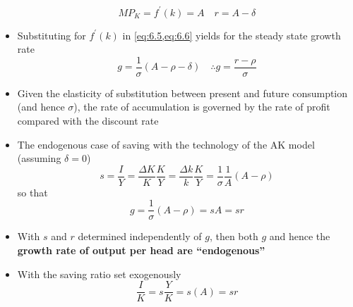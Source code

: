 \documentclass{article}
\begin{document}
\begin{itemize}
	\begin{equation}
		MP_K = f^\prime(k) = A \quad r = A -\delta \label{eq:6.8}
	\end{equation}
	\item Substituting for \( f^\prime(k) \) in \cref{eq:6.5,eq:6.6} yields for the steady state growth rate
	\begin{equation}
		g = \frac{1}{\sigma} (A -\rho -\delta) \quad \therefore g = \frac{r-\rho}{\sigma} \label{eq:6.9}
	\end{equation}
	\item Given the elasticity of substitution between present and future consumption (and hence \( \sigma \)), the rate of accumulation is governed by the rate of profit compared with the discount rate
	\item The endogenous case of saving with the technology of the AK model (assuming \( \delta = 0 \))
	\begin{equation}
		s = \frac{I}{Y} = \frac{\Delta K}{K}\frac{K}{Y} = \frac{\Delta k}{k}\frac{K}{Y} = \frac{1}{\sigma}\frac{1}{A}(A -\rho)
	\end{equation}
	so that
	\begin{equation}
		g = \frac{1}{\sigma} (A - \rho) = sA = sr \label{eq:6.11}
	\end{equation}
	\item With \( s \) and \( r \) determined independently of \( g \), then both \( g \) and hence the \textbf{growth rate of output per head are ``endogenous''}
	\item With the saving ratio set exogenously
	\begin{equation}
		\frac{I}{K} = s \frac{Y}{K} = s(A) = sr \label{eq:6.12}
	\end{equation}
\end{itemize}
\end{document}
